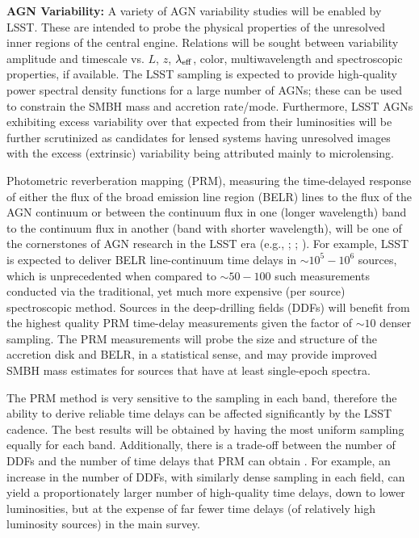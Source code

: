 {\bf AGN Variability:} A variety of AGN variability studies will be enabled by LSST. These are intended to probe the physical properties of the unresolved inner regions of the central engine. Relations will be sought between variability amplitude and timescale vs. $L$, $z$, $\lambda_{\rm eff}$, color, multiwavelength and spectroscopic properties, if available. The LSST sampling is expected to provide high-quality power spectral density functions for a large number of AGNs; these can be used to constrain the SMBH mass and accretion rate/mode. Furthermore, LSST AGNs exhibiting excess variability over that expected from their luminosities will be further scrutinized as candidates for lensed systems having unresolved images with the excess (extrinsic) variability being attributed mainly to microlensing.

Photometric reverberation mapping (PRM), measuring the time-delayed response of either the flux of the broad emission line region (BELR) lines to the flux of the AGN continuum or between the continuum flux in one (longer wavelength) band to the continuum flux in another (band with shorter wavelength), will be one of the cornerstones of AGN research in the LSST era
(e.g., \citet{Chelouche2013}; \citet{CheloucheandZucker2013}; \citet{CheloucheEtal2014}). For example, LSST is expected to deliver BELR line-continuum time delays in $\sim10^5-10^6$ sources, which is unprecedented when compared to $\sim50-100$ such measurements conducted via the traditional, yet much more expensive (per source) spectroscopic method. Sources in the deep-drilling fields (DDFs) will benefit from the highest quality PRM
time-delay measurements given the factor of $\sim10$ denser sampling. The PRM measurements will probe the size and structure of the accretion disk and BELR, in a statistical sense, and may provide improved SMBH mass estimates for sources that have at least single-epoch spectra.

The PRM method is very sensitive to the sampling in each band, therefore the ability to derive reliable time delays can be affected significantly
by the LSST cadence. The best results will be obtained by having the most uniform sampling equally for each band. Additionally, there is
a trade-off between the number of DDFs and the number of time delays that PRM can obtain \citep{CheloucheEtal2014}. For example,
an increase in the number of DDFs, with similarly dense sampling in each field, can yield a proportionately larger number of high-quality time delays,
down to lower luminosities, but at the expense of far fewer time delays (of relatively high luminosity sources) in the main survey.

